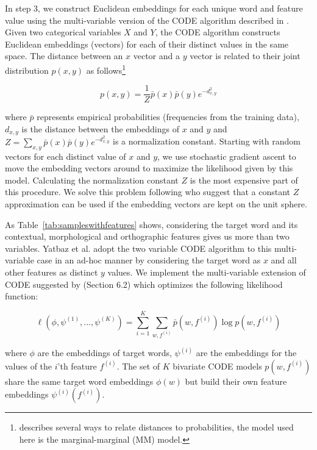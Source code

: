 In step 3, we construct Euclidean embeddings for each unique word and
feature value using the multi-variable version of the CODE algorithm
described in \cite{globerson2007euclidean}.  Given two categorical
variables $X$ and $Y$, the CODE algorithm constructs Euclidean
embeddings (vectors) for each of their distinct values in the same
space.  The distance between an $x$ vector and a $y$ vector is related
to their joint distribution $p(x, y)$ as
follows\footnote{\cite{globerson2007euclidean} describes several ways
  to relate distances to probabilities, the model used here is the
  marginal-marginal (MM) model.}

\[ p(x,y) = \frac{1}{Z} \bar{p}(x) \bar{p}(y) e^{-d^2_{x,y}} \]

\noindent where $\bar{p}$ represents empirical probabilities
(frequencies from the training data), $d_{x,y}$ is the distance
between the embeddings of $x$ and $y$ and $Z=\sum_{x,y} \bar{p}(x)
\bar{p}(y) e^{-d^2_{x,y}}$ is a normalization constant.  Starting with
random vectors for each distinct value of $x$ and $y$, we use
stochastic gradient ascent to move the embedding vectors around to
maximize the likelihood given by this model.  Calculating the
normalization constant $Z$ is the most expensive part of this
procedure.  We solve this problem following \cite{maron2010sphere} who
suggest that a constant $Z$ approximation can be used if the
embedding vectors are kept on the unit sphere.

As Table~\ref{tab:sampleswithfeatures} shows, considering the target
word and its contextual, morphological and orthographic features gives
us more than two variables.  Yatbaz et
al.  adopt the two
variable CODE algorithm to this multi-variable case in an ad-hoc
manner by considering the target word as $x$ and all other features as
distinct $y$ values.  We implement the multi-variable extension of
CODE suggested by \cite{globerson2007euclidean} (Section 6.2) which
optimizes the following likelihood function:

\[ \ell(\phi, \psi^{(1)}, \ldots, \psi^{(K)}) = 
    \sum_{i=1}^K \sum_{w,f^{(i)}} \bar{p}(w,f^{(i)}) \log p(w,f^{(i)}) \]

\noindent where $\phi$ are the embeddings of target words, $\psi^{(i)}$ are the
embeddings for the values of the $i$'th feature $f^{(i)}$.  The set of
$K$ bivariate CODE models
$p(w,f^{(i)})$ share the same target word embeddings $\phi(w)$ but
build their own feature embeddings $\psi^{(i)}(f^{(i)})$.

